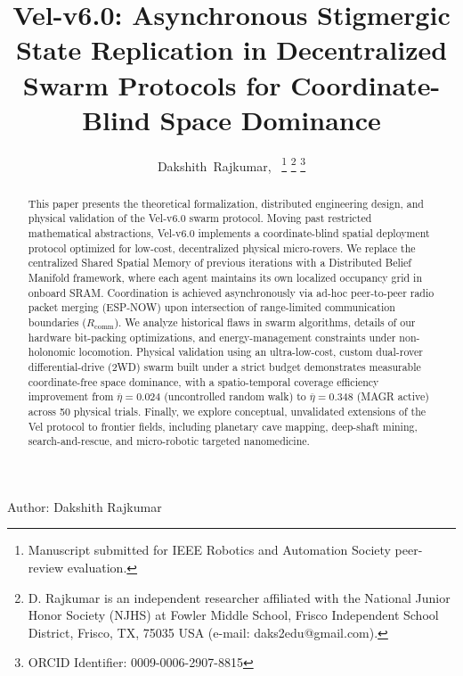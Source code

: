\documentclass[journal,twoside]{IEEEtran}
\begin{document}
\title{\LARGE \bf Vel-v6.0: Asynchronous Stigmergic State Replication in Decentralized Swarm Protocols for Coordinate-Blind Space Dominance}

\author{Dakshith~Rajkumar,~%
\thanks{Manuscript submitted for IEEE Robotics and Automation Society peer-review evaluation.}%
\thanks{D. Rajkumar is an independent researcher affiliated with the National Junior Honor Society (NJHS) at Fowler Middle School, Frisco Independent School District, Frisco, TX, 75035 USA (e-mail: daks2edu@gmail.com).}%
\thanks{ORCID Identifier: 0009-0006-2907-8815}%
}

%
{Author: Dakshith Rajkumar}

\maketitle

\begin{abstract}
This paper presents the theoretical formalization, distributed engineering design, and physical validation of the Vel-v6.0 swarm protocol. Moving past restricted mathematical abstractions, Vel-v6.0 implements a coordinate-blind spatial deployment protocol optimized for low-cost, decentralized physical micro-rovers. We replace the centralized Shared Spatial Memory of previous iterations with a Distributed Belief Manifold framework, where each agent maintains its own localized occupancy grid in onboard SRAM. Coordination is achieved asynchronously via ad-hoc peer-to-peer radio packet merging (ESP-NOW) upon intersection of range-limited communication boundaries ($R_{\text{comm}}$). We analyze historical flaws in swarm algorithms, details of our hardware bit-packing optimizations, and energy-management constraints under non-holonomic locomotion. Physical validation using an ultra-low-cost, custom dual-rover differential-drive (2WD) swarm built under a strict budget demonstrates measurable coordinate-free space dominance, with a spatio-temporal coverage efficiency improvement from $\overline{\eta} = 0.024$ (uncontrolled random walk) to $\overline{\eta} = 0.348$ (MAGR active) across 50 physical trials. Finally, we explore conceptual, unvalidated extensions of the Vel protocol to frontier fields, including planetary cave mapping, deep-shaft mining, search-and-rescue, and micro-robotic targeted nanomedicine.
\end{abstract}
\end{document}
